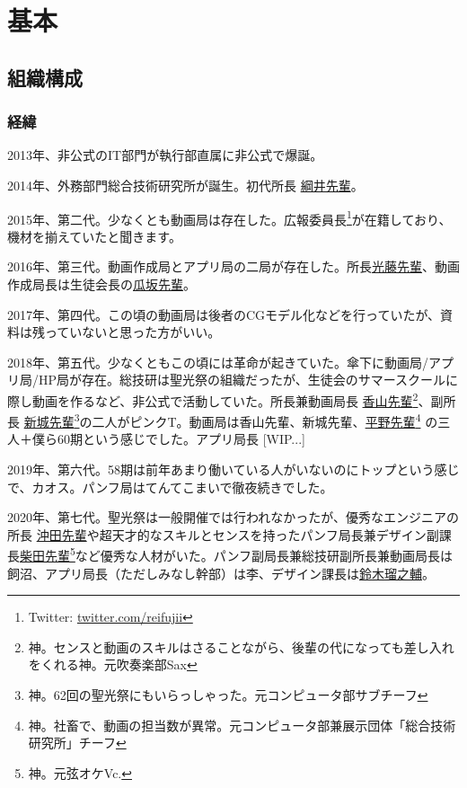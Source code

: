 \documentclass[dvipdfmx,jb5]{jarticle}
\newcommand{\mail}[2]{\href{#2}{#1}}
\begin{document}
\section{基本}
\subsection{組織構成}
\subsubsection{経緯}
2013年、非公式のIT部門が執行部直属に非公式で爆誕。

2014年、外務部門総合技術研究所が誕生。初代所長 \mail{綱井先輩}{53127tsunai@seiko.ac.jp}。

2015年、第二代。少なくとも動画局は存在した。広報委員長\footnote{Twitter: \url{twitter.com/reifujii}}が在籍しており、機材を揃えていたと聞きます。

2016年、第三代。動画作成局とアプリ局の二局が存在した。所長\mail{光藤先輩}{55201mitsudo@seiko.ac.jp}、動画作成局長は生徒会長の\mail{瓜坂先輩}{55031urisaka@seiko.ac.jp}。

2017年、第四代。この頃の動画局は後者のCGモデル化などを行っていたが、資料は残っていないと思った方がいい。

2018年、第五代。少なくともこの頃には革命が起きていた。傘下に動画局/アプリ局/HP局が存在。総技研は聖光祭の組織だったが、生徒会のサマースクールに際し動画を作るなど、非公式で活動していた。所長兼動画局長 \mail{香山先輩}{57084koyama@seiko.ac.jp}\footnote{神。センスと動画のスキルはさることながら、後輩の代になっても差し入れをくれる神。元吹奏楽部Sax}、副所長 \mail{新城先輩}{57011araki@seiko.ac.jp}\footnote{神。62回の聖光祭にもいらっしゃった。元コンピュータ部サブチーフ}の二人がピンクT。動画局は香山先輩、新城先輩、\mail{平野先輩}{57174hirano@seiko.ac.jp}\footnote{ 神。社畜で、動画の担当数が異常。元コンピュータ部兼展示団体「総合技術研究所」チーフ} の三人＋僕ら60期という感じでした。アプリ局長 [WIP...]

2019年、第六代。58期は前年あまり働いている人がいないのにトップという感じで、カオス。パンフ局はてんてこまいで徹夜続きでした。

2020年、第七代。聖光祭は一般開催では行われなかったが、優秀なエンジニアの所長 \mail{沖田先輩}{59039okita@seiko.ac.jp}や超天才的なスキルとセンスを持ったパンフ局長兼デザイン副課長\mail{柴田先輩}{59091shibataseiko.ac.jp}\footnote{神。元弦オケVc.}など優秀な人材がいた。パンフ副局長兼総技研副所長兼動画局長は飼沼、アプリ局長（ただしみなし幹部）は李、デザイン課長は\mail{鈴木瑠之輔}{60111suzuki@seiko.ac.jp}。
\end{document}
